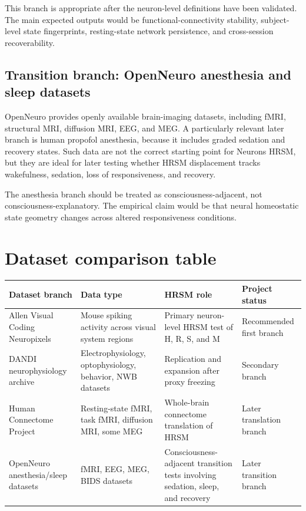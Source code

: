 \documentclass[11pt]{article}
\begin{document}
This branch is appropriate after the neuron-level definitions have been validated. The main expected outputs would be functional-connectivity stability, subject-level state fingerprints, resting-state network persistence, and cross-session recoverability.

\subsection{Transition branch: OpenNeuro anesthesia and sleep datasets}

OpenNeuro provides openly available brain-imaging datasets, including fMRI, structural MRI, diffusion MRI, EEG, and MEG. A particularly relevant later branch is human propofol anesthesia, because it includes graded sedation and recovery states. Such data are not the correct starting point for Neurons HRSM, but they are ideal for later testing whether HRSM displacement tracks wakefulness, sedation, loss of responsiveness, and recovery.

The anesthesia branch should be treated as consciousness-adjacent, not consciousness-explanatory. The empirical claim would be that neural homeostatic state geometry changes across altered responsiveness conditions.

\section{Dataset comparison table}

\begin{longtable}{p{}p{}p{}p{}}
\toprule
Dataset branch & Data type & HRSM role & Project status \\
\midrule
Allen Visual Coding Neuropixels & Mouse spiking activity across visual system regions & Primary neuron-level HRSM test of H, R, S, and M & Recommended first branch \\
DANDI neurophysiology archive & Electrophysiology, optophysiology, behavior, NWB datasets & Replication and expansion after proxy freezing & Secondary branch \\
Human Connectome Project & Resting-state fMRI, task fMRI, diffusion MRI, some MEG & Whole-brain connectome translation of HRSM & Later translation branch \\
OpenNeuro anesthesia/sleep datasets & fMRI, EEG, MEG, BIDS datasets & Consciousness-adjacent transition tests involving sedation, sleep, and recovery & Later transition branch \\
\bottomrule
\end{longtable}
\end{document}
